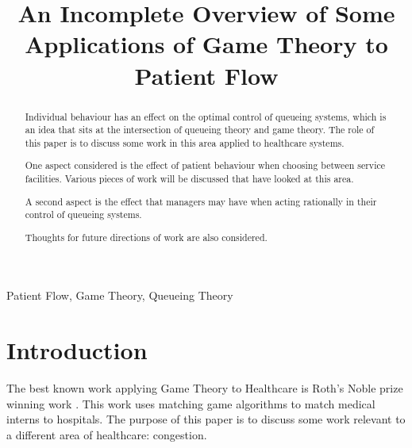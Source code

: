 \documentclass[a4paper,11pt]{article}
\title{An Incomplete Overview of Some Applications of Game Theory to Patient Flow}
\begin{document}
\maketitle

\author{
}

%
%
%

\vspace{8mm}

\begin{abstract}

Individual behaviour has an effect on the optimal control of queueing systems, which is an idea that sits at the intersection of queueing theory and game theory.
The role of this paper is to discuss some work in this area applied to healthcare systems.

One aspect considered is the effect of patient behaviour when choosing between service facilities.
Various pieces of work will be discussed that have looked at this area.

A second aspect is the effect that managers may have when acting rationally in their control of queueing systems.

Thoughts for future directions of work are also considered.
\end{abstract}

\bigskip
\begin{keywords}
Patient Flow, Game Theory, Queueing Theory

\bigskip
{}
\end{keywords}


\newpage

\section{Introduction}

The best known work applying Game Theory to Healthcare is Roth's Noble prize winning work \cite{Roth}.
This work uses matching game algorithms to match medical interns to hospitals.
The purpose of this paper is to discuss some work relevant to a different area of healthcare: congestion.
\end{document}
